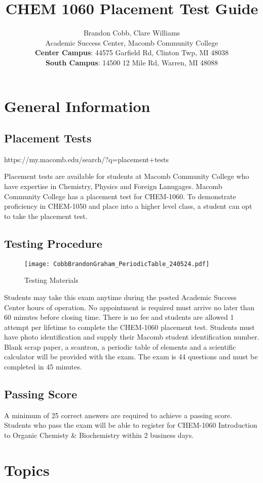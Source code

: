 \documentclass[10pt, roman]{article}
\title{CHEM 1060 Placement Test Guide}
\author{
Brandon Cobb, Clare Williams \\
Academic Success Center, Macomb Community College \\
\textbf{Center Campus}: 44575 Garfield Rd, Clinton Twp, MI 48038 \\
\textbf{South Campus}: 14500 12 Mile Rd, Warren, MI 48088
}
\begin{document}
\maketitle

\tableofcontents

\section{General Information}
\subsection{Placement Tests}
{\centering https://my.macomb.edu/search/?q=placement+tests\par}
Placement tests are available for students at Macomb Community College who have expertise in Chemistry, Physics and Foreign Lanugages.
Macomb Community College has a placement test for CHEM-1060.
To demonstrate proficiency in CHEM-1050 and place into a higher level class, a student can opt to take the placement test.
\newpage
\subsection{Testing Procedure}
\begin{figure}[ht!]
\centering
\texttt{[image: CobbBrandonGraham\_PeriodicTable\_240524.pdf]}
\caption{Testing Materials}
\label{overflow}
\end{figure}
Students may take this exam anytime during the posted Academic Success Center hours of operation.
No appointment is required must arrive no later than 60 minutes before closing time.
There is no fee and students are allowed 1 attempt per lifetime to complete the CHEM-1060 placement test.
Students must have photo identification and supply their Macomb student identification number.
Blank scrap paper, a scantron, a periodic table of elements and a scientific calculator will be provided with the exam.
The exam is 44 questions and must be completed in 45 minutes.
\subsection{Passing Score}
A minimum of 25 correct answers are required to achieve a passing score.
Students who pass the exam will be able to register for CHEM-1060 Introduction to Organic Chemisty \& Biochemistry within 2 business days.

\section{Topics}
\end{document}
